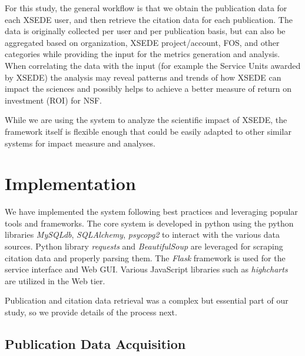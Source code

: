 \documentclass{sig-alternate}
\begin{document}
For this study, the general workflow is that we obtain the publication data for each XSEDE user, and then retrieve the citation data for each publication. The data is originally collected per user and per publication basis, but can also be aggregated based on organization, XSEDE project/account, FOS, and other categories while providing the input for the metrics generation and analysis. When correlating the data with the input (for example the Service Units awarded by XSEDE) the analysis may reveal patterns and trends of how XSEDE can impact the sciences and possibly helps to achieve a better measure of return on investment (ROI) for NSF. 
 
While we are using the system to analyze the scientific impact of XSEDE, the framework itself is flexible enough that could be easily adapted to other similar systems for impact measure and analyses. 
 
 
\section{Implementation} \label{S:implementation}
 
We have implemented the system following best practices and leveraging popular tools and frameworks. The core system is developed in python using the  python libraries \emph{MySQLdb}, \emph{SQLAlchemy}, \emph{psycopg2} to interact with the various data sources. Python library \emph{requests} and \emph{BeautifulSoup} are leveraged for scraping citation data and properly parsing them. The \emph{Flask} framework is used for the service interface and Web GUI. Various JavaScript libraries such as \emph{highcharts} are utilized in the Web tier. 
 
Publication and citation data retrieval was a complex but essential part of our study, so we provide details of the process next. 
  
\subsection{Publication Data Acquisition} 
 
\end{document}
